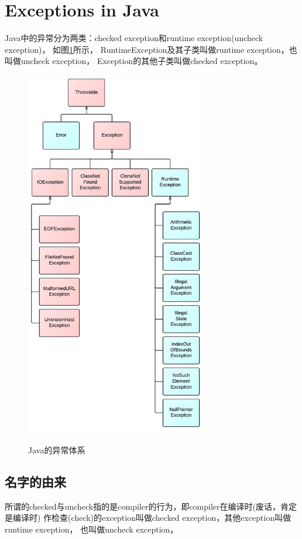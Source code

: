 ﻿\section[Exceptions in Java]{Exceptions in Java}
Java中的异常分为两类：checked exception和runtime exception(uncheck exception)，
如图\ref{fig:exceptions}所示，
RuntimeException及其子类叫做runtime exception，也叫做uncheck exception，
Exception的其他子类叫做checked exception。

\begin{figure}
  \centering
  \includegraphics[width=0.7\textwidth]{picturedir/JavaExceptions.jpeg}\\
  \caption{Java的异常体系}\label{fig:exceptions}
\end{figure}

\subsection[名字的由来]{名字的由来}
所谓的checked与uncheck指的是compiler的行为，即compiler在编译时(废话，肯定是编译时)
作检查(check)的exception叫做checked exception，其他exception叫做runtime exception，
也叫做uncheck exception，

